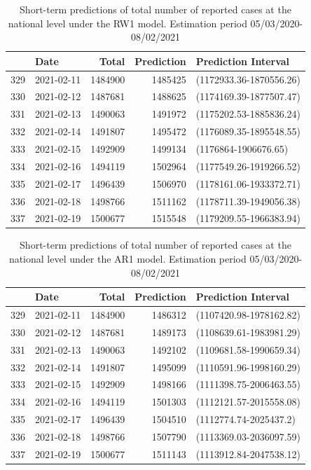 \documentclass[10pt,letterpaper]{article}
\begin{document}
\begin{table}

\caption{\label{tab:unnamed-chunk-10}Short-term predictions of total number of reported cases at the national level under the RW1 model. Estimation period 05/03/2020-08/02/2021}
\centering
\begin{tabular}[t]{l|l|r|r|l}
\hline
  & Date & Total & Prediction & Prediction Interval\\
\hline
329 & 2021-02-11 & 1484900 & 1485425 & (1172933.36-1870556.26)\\
\hline
330 & 2021-02-12 & 1487681 & 1488625 & (1174169.39-1877507.47)\\
\hline
331 & 2021-02-13 & 1490063 & 1491972 & (1175202.53-1885836.24)\\
\hline
332 & 2021-02-14 & 1491807 & 1495472 & (1176089.35-1895548.55)\\
\hline
333 & 2021-02-15 & 1492909 & 1499134 & (1176864-1906676.65)\\
\hline
334 & 2021-02-16 & 1494119 & 1502964 & (1177549.26-1919266.52)\\
\hline
335 & 2021-02-17 & 1496439 & 1506970 & (1178161.06-1933372.71)\\
\hline
336 & 2021-02-18 & 1498766 & 1511162 & (1178711.39-1949056.38)\\
\hline
337 & 2021-02-19 & 1500677 & 1515548 & (1179209.55-1966383.94)\\
\hline
\end{tabular}
\end{table}

\begin{table}

\caption{\label{tab:unnamed-chunk-10}Short-term predictions of total number of reported cases at the national level under the AR1 model. Estimation period 05/03/2020-08/02/2021}
\centering
\begin{tabular}[t]{l|l|r|r|l}
\hline
  & Date & Total & Prediction & Prediction Interval\\
\hline
329 & 2021-02-11 & 1484900 & 1486312 & (1107420.98-1978162.82)\\
\hline
330 & 2021-02-12 & 1487681 & 1489173 & (1108639.61-1983981.29)\\
\hline
331 & 2021-02-13 & 1490063 & 1492102 & (1109681.58-1990659.34)\\
\hline
332 & 2021-02-14 & 1491807 & 1495099 & (1110591.96-1998160.29)\\
\hline
333 & 2021-02-15 & 1492909 & 1498166 & (1111398.75-2006463.55)\\
\hline
334 & 2021-02-16 & 1494119 & 1501303 & (1112121.57-2015558.08)\\
\hline
335 & 2021-02-17 & 1496439 & 1504510 & (1112774.74-2025437.2)\\
\hline
336 & 2021-02-18 & 1498766 & 1507790 & (1113369.03-2036097.59)\\
\hline
337 & 2021-02-19 & 1500677 & 1511143 & (1113912.84-2047538.12)\\
\hline
\end{tabular}
\end{table}
\end{document}
